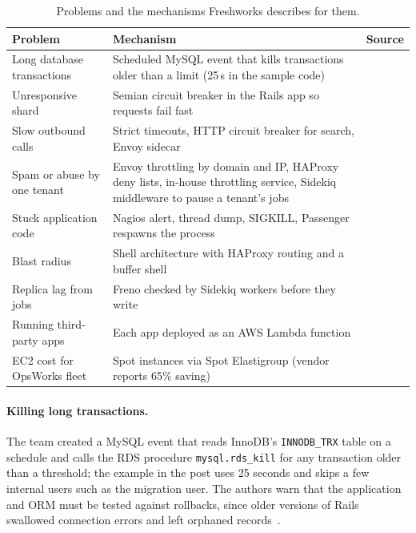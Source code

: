 \documentclass[10pt,a4paper]{article}
\newcommand{\code}[1]{\texttt{#1}}
\begin{document}
\begin{table}[ht]
\centering\small
\caption{Problems and the mechanisms Freshworks describes for them.}\label{tab:solutions}
\begin{tabularx}{\textwidth}{@{}l Y l@{}}
\toprule
Problem & Mechanism & Source \\
\midrule
Long database transactions & Scheduled MySQL event that kills transactions older than a limit (25\,s in the sample code) & \cite{kumar2020} \\
Unresponsive shard & Semian circuit breaker in the Rails app so requests fail fast & \cite{kumar2020} \\
Slow outbound calls & Strict timeouts, HTTP circuit breaker for search, Envoy sidecar & \cite{kumar2020} \\
Spam or abuse by one tenant & Envoy throttling by domain and IP, HAProxy deny lists, in-house throttling service, Sidekiq middleware to pause a tenant's jobs & \cite{kumar2020} \\
Stuck application code & Nagios alert, thread dump, SIGKILL, Passenger respawns the process & \cite{kumar2020} \\
Blast radius & Shell architecture with HAProxy routing and a buffer shell & \cite{mallapu2021,srinivasan2023} \\
Replica lag from jobs & Freno checked by Sidekiq workers before they write & \cite{bgjobs,freno} \\
Running third-party apps & Each app deployed as an AWS Lambda function & \cite{awslambda} \\
EC2 cost for OpsWorks fleet & Spot instances via Spot Elastigroup (vendor reports 65\% saving) & \cite{spot} \\
\bottomrule
\end{tabularx}
\end{table}

\paragraph{Killing long transactions.} The team created a MySQL event that reads InnoDB's \code{INNODB\_TRX} table on a schedule and calls the RDS procedure \code{mysql.rds\_kill} for any transaction older than a threshold; the example in the post uses 25 seconds and skips a few internal users such as the migration user. The authors warn that the application and ORM must be tested against rollbacks, since older versions of Rails swallowed connection errors and left orphaned records~\cite{kumar2020}.
\end{document}
